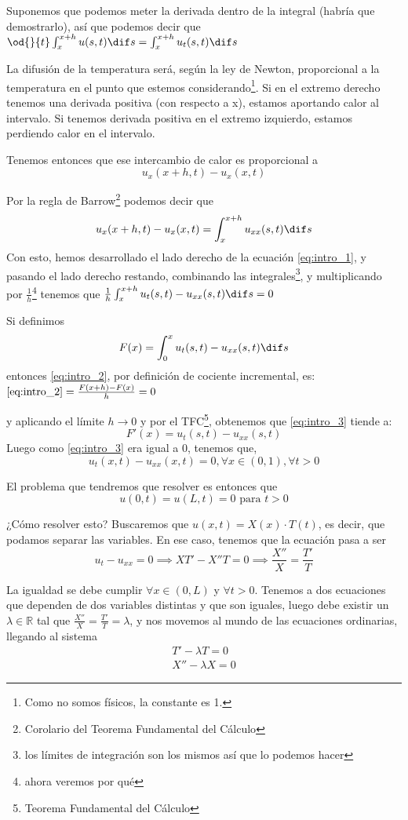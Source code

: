 \documentclass[palatino]{apuntes}
\begin{document}
Suponemos que podemos meter la derivada dentro de la integral (habría que demostrarlo), así que podemos decir que \(  \od{}{t} \int_x^{x+h} u(s,t) \dif s = \int_x^{x+h} u_t(s,t) \dif s \label{eq:intro_1}\)

La difusión de la temperatura será, según la ley de Newton, proporcional a la temperatura en el punto que estemos considerando\footnote{Como no somos físicos, la constante es 1.}. Si en el extremo derecho tenemos una derivada positiva (con respecto a x), estamos aportando calor al intervalo. Si tenemos derivada positiva en el extremo izquierdo, estamos perdiendo calor en el intervalo.

Tenemos entonces que ese intercambio de calor es proporcional a \[u_x(x+h, t) - u_x(x,t)\]

Por la regla de Barrow\footnote{Corolario del Teorema Fundamental del Cálculo} podemos decir que \[ u_x(x+h, t) - u_x(x,t) = \int_x^{x+h} u_{xx}(s,t) \dif s\]
Con esto, hemos desarrollado el lado derecho de la ecuación \ref{eq:intro_1}, y pasando el lado derecho restando, combinando las integrales\footnote{los límites de integración son los mismos así que lo podemos hacer}, y multiplicando por $\frac{1}{h}$\footnote{ahora veremos por qué} tenemos que
\( \frac{1}{h} \int_{x}^{x+h} u_t(s,t) - u_{xx}(s,t) \dif s = 0 \label{eq:intro_2}\)

Si definimos $$F(x) = \int_{0}^{x} u_t(s,t) - u_{xx}(s,t) \dif s $$ entonces \ref{eq:intro_2}, por definición de cociente incremental, es:
\( \ref{eq:intro_2} = \frac{F(x+h) - F(x)}{h} = 0  \label{eq:intro_3}\)

y aplicando el límite $h \to 0$ y por el TFC\footnote{Teorema Fundamental del Cálculo}, obtenemos que \ref{eq:intro_3} tiende a:
\[ F'(x) = u_t(s,t) - u_{xx}(s,t) \]
Luego como \ref{eq:intro_3} era igual a 0, tenemos que,
\[ u_t(x,t) - u_{xx} (x,t) = 0, \forall x \in (0,1), \forall t > 0\]

El problema que tendremos que resolver es entonces que
$$u(0,t) = u(L,t) = 0 \text{ para } t > 0$$

¿Cómo resolver esto? Buscaremos que $u(x,t) = X(x) · T(t)$, es decir, que podamos separar las variables. En ese caso, tenemos que la ecuación pasa a ser \[ u_t - u_{xx} = 0 \implies XT' - X''T = 0 \implies \frac{X''}{X} = \frac{T'}{T} \]

La igualdad se debe cumplir $∀x ∈ (0,L)$ y $∀t > 0$. Tenemos a dos ecuaciones que dependen de dos variables distintas y que son iguales, luego debe existir un $λ ∈ ℝ$ tal que $\frac{X''}{X} = \frac{T'}{T} = λ$, y nos movemos al mundo de las ecuaciones ordinarias, llegando al sistema  \[ \begin{matrix} T' - λT = 0 \\ X'' - λX = 0 \end{matrix}\]
\end{document}
